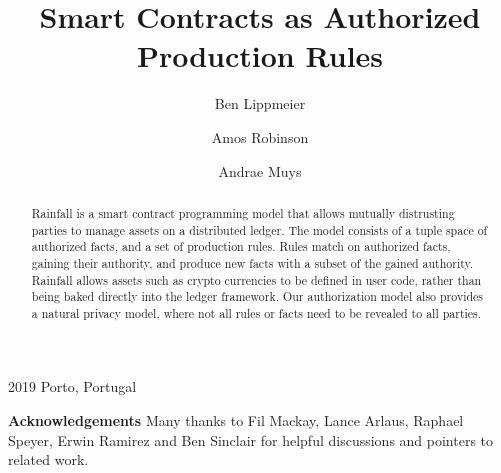 \documentclass[format=sigconf, review=true, screen=true]{acmart}
\begin{document}
        {2019}
        {Porto, Portugal}

\title{Smart Contracts as Authorized Production Rules}

\author{Ben Lippmeier}

\author{Amos Robinson}

\author{Andrae Muys}

\begin{abstract}
Rainfall is a smart contract programming model that allows mutually distrusting parties to manage assets on a distributed ledger. The model consists of a tuple space of authorized facts, and a set of production rules. Rules match on authorized facts, gaining their authority, and produce new facts with a subset of the gained authority. Rainfall allows assets such as crypto currencies to be defined in user code, rather than being baked directly into the ledger framework. Our authorization model also provides a natural privacy model, where not all rules or facts need to be revealed to all parties.
\end{abstract}

\maketitle
\makeatactive









\textbf{Acknowledgements}
Many thanks to Fil Mackay, Lance Arlaus, Raphael Speyer, Erwin Ramirez and Ben Sinclair for helpful discussions and pointers to related work.




\clearpage{}



\clearpage{}

\end{document}
